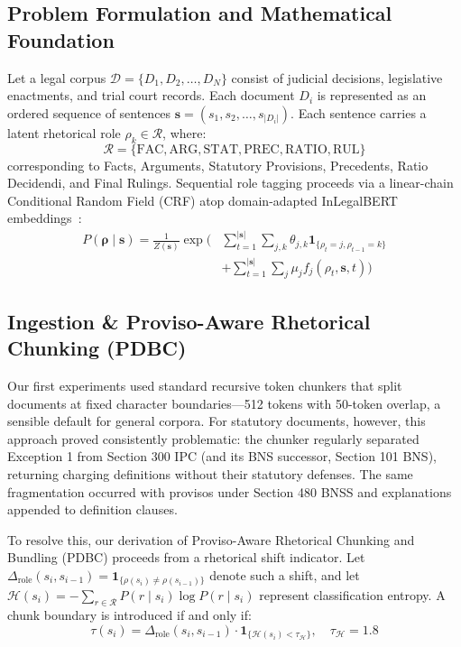 \documentclass[conference]{IEEEtran}
\begin{document}
\subsection{Problem Formulation and Mathematical Foundation}
Let a legal corpus $\mathcal{D} = \{D_1, D_2, \dots, D_N\}$ consist of judicial decisions, legislative enactments, and trial court records. Each document $D_i$ is represented as an ordered sequence of sentences $\mathbf{s} = (s_1, s_2, \dots, s_{|D_i|})$. Each sentence carries a latent rhetorical role $\rho_k \in \mathcal{R}$, where:
\begin{equation}
\mathcal{R} = \{\text{FAC}, \text{ARG}, \text{STAT}, \text{PREC}, \text{RATIO}, \text{RUL}\}
\end{equation}
corresponding to Facts, Arguments, Statutory Provisions, Precedents, Ratio Decidendi, and Final Rulings. Sequential role tagging proceeds via a linear-chain Conditional Random Field (CRF) atop domain-adapted InLegalBERT embeddings~\cite{lafferty2001crf}:
\begin{equation}
\begin{aligned}
P(\mathbf{\rho} \mid \mathbf{s}) = \frac{1}{Z(\mathbf{s})} \exp\Biggl( &\sum_{t=1}^{|\mathbf{s}|} \sum_{j, k} \theta_{j, k} \mathbf{1}_{\{\rho_t = j, \rho_{t-1} = k\}} \\
&+ \sum_{t=1}^{|\mathbf{s}|} \sum_j \mu_j f_j(\rho_t, \mathbf{s}, t) \Biggr)
\end{aligned}
\end{equation}

\subsection{Ingestion \& Proviso-Aware Rhetorical Chunking (PDBC)}
Our first experiments used standard recursive token chunkers that split documents at fixed character boundaries---512 tokens with 50-token overlap, a sensible default for general corpora. For statutory documents, however, this approach proved consistently problematic: the chunker regularly separated Exception 1 from Section 300 IPC (and its BNS successor, Section 101 BNS), returning charging definitions without their statutory defenses. The same fragmentation occurred with provisos under Section 480 BNSS and explanations appended to definition clauses.

To resolve this, our derivation of Proviso-Aware Rhetorical Chunking and Bundling (PDBC) proceeds from a rhetorical shift indicator. Let $\Delta_{\text{role}}(s_i, s_{i-1}) = \mathbf{1}_{\{\rho(s_i) \ne \rho(s_{i-1})\}}$ denote such a shift, and let $\mathcal{H}(s_i) = -\sum_{r \in \mathcal{R}} P(r \mid s_i) \log P(r \mid s_i)$ represent classification entropy. A chunk boundary is introduced if and only if:
\begin{equation}
\tau(s_i) = \Delta_{\text{role}}(s_i, s_{i-1}) \cdot \mathbf{1}_{\{\mathcal{H}(s_i) < \tau_{\mathcal{H}}\}}, \quad \tau_{\mathcal{H}} = 1.8
\end{equation}
\end{document}
